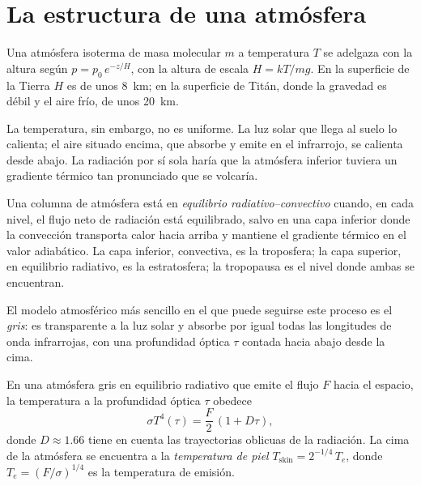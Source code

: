 \section{La estructura de una atmósfera}\label{sec:b3:planetary-atmospheres:structure}

Una atmósfera isoterma de masa molecular $m$ a temperatura $T$ se adelgaza
con la altura según $p = p_0\,e^{-z/H}$, con la altura de escala $H = kT/mg$. En
la superficie de la Tierra $H$ es de unos \qty{8}{km}; en la superficie de
Titán, donde la gravedad es débil y el aire frío, de unos \qty{20}{km}.

La temperatura, sin embargo, no es uniforme. La luz solar que llega al suelo
lo calienta; el aire situado encima, que absorbe y emite en el infrarrojo, se
calienta desde abajo. La radiación por sí sola haría que la atmósfera inferior
tuviera un gradiente térmico tan pronunciado que se volcaría.

\begin{definition}\label{def:b3:planetary-atmospheres:rce}
Una columna de atmósfera está en \emph{equilibrio radiativo--convectivo
} cuando, en cada nivel,
el flujo neto de radiación está equilibrado, salvo en una capa inferior donde la convección transporta calor hacia arriba
y mantiene el gradiente térmico en el valor adiabático. La capa inferior,
convectiva, es la troposfera; la capa superior, en equilibrio radiativo,
es la estratosfera; la tropopausa
es el nivel donde ambas se encuentran.
\end{definition}

El modelo atmosférico más sencillo en el que puede seguirse este proceso es el \emph{gris}: es
transparente a la luz solar y absorbe por igual todas las longitudes de onda infrarrojas,
con una profundidad óptica $\tau$ contada hacia abajo desde la cima.

\begin{proposition}\label{prop:b3:planetary-atmospheres:grey}
En una atmósfera gris en equilibrio radiativo que emite el flujo $F$ hacia el
espacio, la temperatura a la profundidad óptica $\tau$ obedece
\[
\sigma T^4(\tau) = \frac F2\,(1 + D\tau),
\]
donde $D \approx 1.66$ tiene en cuenta las trayectorias oblicuas de la radiación.
La cima de la atmósfera se encuentra a la \emph{temperatura de piel}
$T_\mathrm{skin} = 2^{-1/4}\,T_e$, donde $T_e = (F/\sigma)^{1/4}$ es la
temperatura de emisión.
\end{proposition}

